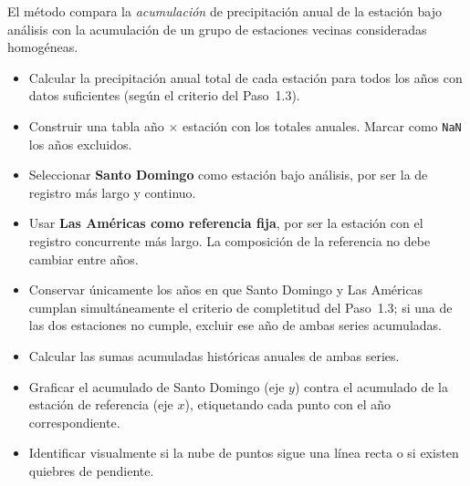\documentclass[11pt]{article}
\begin{document}
El método compara la \emph{acumulación} de precipitación anual de la estación bajo
análisis con la acumulación de un grupo de estaciones vecinas consideradas homogéneas.


\begin{itemize}
  \item Calcular la precipitación anual total de cada estación para todos los años
    con datos suficientes (según el criterio del Paso~1.3).
  \item Construir una tabla año $\times$ estación con los totales anuales.
    Marcar como \texttt{NaN} los años excluidos.
\end{itemize}


\begin{itemize}
  \item Seleccionar \textbf{Santo Domingo} como estación bajo análisis, por ser la
    de registro más largo y continuo.
  \item Usar \textbf{Las Américas como referencia fija}, por ser la estación con
    el registro concurrente más largo. La composición de la referencia no debe
    cambiar entre años.
  \item Conservar únicamente los años en que Santo Domingo y Las Américas cumplan
    simultáneamente el criterio de completitud del Paso~1.3; si una de las dos
    estaciones no cumple, excluir ese año de ambas series acumuladas.
  \item Calcular las sumas acumuladas históricas anuales de ambas series.
  \item Graficar el acumulado de Santo Domingo (eje $y$) contra el acumulado de la
    estación de referencia (eje $x$), etiquetando cada punto con el año correspondiente.
  \item Identificar visualmente si la nube de puntos sigue una línea recta o si
    existen quiebres de pendiente.
\end{itemize}

\end{document}
